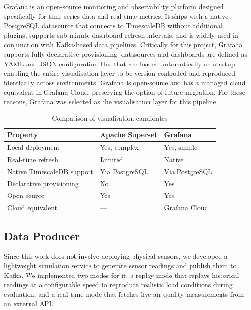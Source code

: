 Grafana is an open-source monitoring and observability platform designed specifically for time-series data and real-time metrics. It ships with a native PostgreSQL datasource that connects to TimescaleDB without additional plugins, supports sub-minute dashboard refresh intervals, and is widely used in conjunction with Kafka-based data pipelines. Critically for this project, Grafana supports fully declarative provisioning: datasources and dashboards are defined as YAML and JSON configuration files that are loaded automatically on startup, enabling the entire visualisation layer to be version-controlled and reproduced identically across environments. Grafana is open-source and has a managed cloud equivalent in Grafana Cloud, preserving the option of future migration. For these reasons, Grafana was selected as the visualisation layer for this pipeline.

\begin{table}[H]
\centering
\caption{Comparison of visualisation candidates}
\label{tab:viz-comparison}
\begin{tabular}{|l|l|l|}
\hline
\textbf{Property} & \textbf{Apache Superset} & \textbf{Grafana} \\
\hline
Local deployment           & Yes, complex   & Yes, simple    \\\hline
Real-time refresh          & Limited        & Native         \\\hline
Native TimescaleDB support & Via PostgreSQL & Via PostgreSQL \\\hline
Declarative provisioning   & No             & Yes            \\\hline
Open-source                & Yes            & Yes            \\\hline
Cloud equivalent           & —              & Grafana Cloud  \\\hline
\end{tabular}
\end{table}

\subsection{Data Producer}

Since this work does not involve deploying physical sensors, we developed a lightweight simulation service to generate sensor readings and publish them to Kafka. We implemented two modes for it: a replay mode that replays historical readings at a configurable speed to reproduce realistic load conditions during evaluation, and a real-time mode that fetches live air quality measurements from an external API.


